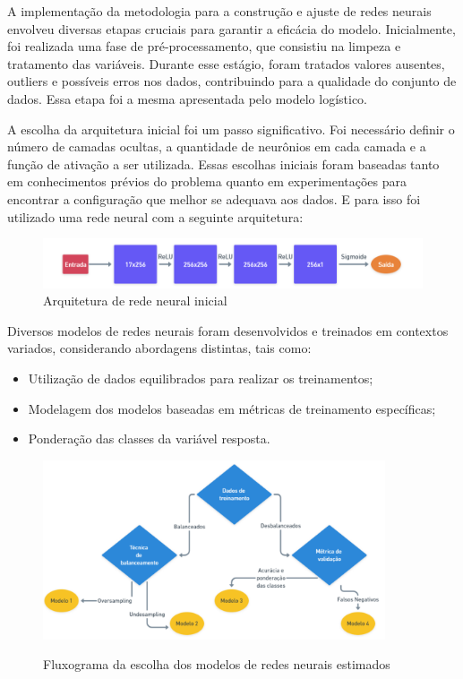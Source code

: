 A implementação da metodologia para a construção e ajuste de redes neurais envolveu diversas etapas cruciais 
para garantir a eficácia do modelo. Inicialmente, foi realizada uma fase de pré-processamento, que consistiu
na limpeza e tratamento das variáveis. Durante esse estágio, foram tratados valores ausentes, outliers e possíveis
erros nos dados, contribuindo para a qualidade do conjunto de dados. Essa etapa foi a mesma apresentada pelo
modelo logístico.

A escolha da arquitetura inicial foi um passo significativo. Foi necessário definir o número de camadas ocultas,
a quantidade de neurônios em cada camada e a função de ativação a ser utilizada. Essas escolhas iniciais foram 
baseadas tanto em conhecimentos prévios do problema quanto em experimentações para encontrar a configuração que 
melhor se adequava aos dados. 
E para isso foi utilizado uma rede neural com a seguinte arquitetura:

\begin{figure}[H]
  \centering
  \includegraphics[width=1\textwidth]{imagens/arc_rede_neural.png}
  \caption{Arquitetura de rede neural inicial}
  \label{fig:imagens/arc_rede_neural.png}
\end{figure}


Diversos modelos de redes neurais foram desenvolvidos e treinados em contextos variados, considerando abordagens distintas, tais como:

\begin{itemize}
  \item Utilização de dados equilibrados para realizar os treinamentos;
  \item Modelagem dos modelos baseadas em métricas de treinamento específicas;
  \item Ponderação das classes da variável resposta.
\end{itemize}

\begin{figure}[H]
  \caption{Fluxograma da escolha dos modelos de redes neurais estimados}
  \centering
  \includegraphics[width=0.9\textwidth]{imagens/fluxograma_selecao_modelo_neural.png}
  \label{fig:imagens/fluxograma_selecao_modelo_neural.png}
\end{figure}



